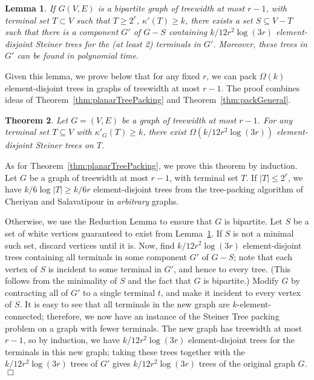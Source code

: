 \documentclass[11pt]{article}
\newtheorem{lemma}{Lemma}[section]
\newtheorem{theorem}[lemma]{Theorem}
\newcommand{\elconn}{\kappa'}
\renewenvironment{proof}{\vspace{-0.1in}\noindent{\bf Proof:}}{\hspace*{\fill}$\Box$\par}
\begin{document}
\begin{lemma}\label{lem:treewidthSeparator}
  If $G(V, E)$ is a bipartite graph of treewidth at most $r-1$, with
  terminal set $T \subset V$ such that $T \ge 2^r$, $\elconn(T) \ge
  k$, there exists a set $S \subseteq V - T$ such that there is a
  component $G'$ of $G - S$ containing $k/12 r^2 \log (3r)$
  element-disjoint Steiner trees for the (at least 2) terminals in
  $G'$. Moreover, these trees in $G'$ can be found in polynomial time.
\end{lemma}

Given this lemma, we prove below that for any fixed $r$, we can pack
$\Omega(k)$ element-disjoint trees in graphs of treewidth at most
$r-1$. The proof combines ideas of Theorem~\ref{thm:planarTreePacking}
and Theorem~\ref{thm:packGeneral}.

\begin{theorem} \label{thm:treewidth}
  Let $G=(V,E)$ be a graph of treewidth at most $r-1$.  For any terminal
  set $T \subseteq V$ with $\elconn_G(T) \ge k$, there exist
  $\Omega(k/12 r^2 \log (3r))$ element-disjoint Steiner trees on $T$.
\end{theorem}
\begin{proof}
  As for Theorem~\ref{thm:planarTreePacking}, we prove this theorem by
  induction. Let $G$ be a graph of treewidth at most $r-1$, with
  terminal set $T$. If $|T| \le 2^r$, we have $k/6 \log |T| \ge k/6r$
  element-disjoint trees from the tree-packing algorithm of Cheriyan
  and Salavatipour \cite{cs} in \emph{arbitrary} graphs.

  Otherwise, we use the Reduction Lemma to ensure that $G$ is
  bipartite. Let $S$ be a set of white vertices guaranteed to exist
  from Lemma~\ref{lem:treewidthSeparator}. If $S$ is not a minimal
  such set, discard vertices until it is. Now, find $k/12 r^2 \log
  (3r)$ element-disjoint trees containing all terminals in some
  component $G'$ of $G - S$; note that each vertex of $S$ is incident
  to some terminal in $G'$, and hence to every tree. (This follows
  from the minimality of $S$ and the fact that $G$ is bipartite.)
  Modify $G$ by contracting all of $G'$ to a single terminal $t$, and
  make it incident to every vertex of $S$. It is easy to see that all
  terminals in the new graph are $k$-element-connected; therefore, we
  now have an instance of the Steiner Tree packing problem on a graph
  with fewer terminals. The new graph has treewidth at most $r-1$, so
  by induction, we have $k/12 r^2 \log (3r)$ element-disjoint trees
  for the terminals in this new graph; taking these trees together
  with the $k / 12r^2 \log (3r)$ trees of $G'$ gives $k/12 r^2 \log
  (3r)$ trees of the original graph $G$.
\end{proof}
\end{document}
